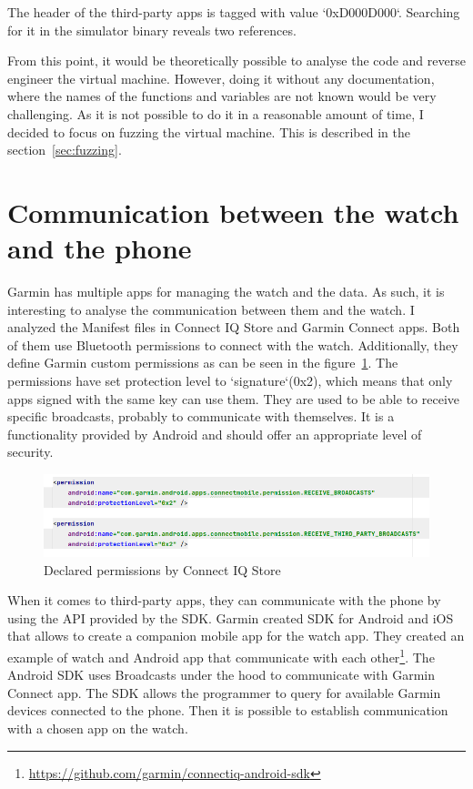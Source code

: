 The header of the third-party apps is tagged with value `0xD000D000`\cite{broken-vm}.
Searching for it in the simulator binary reveals two references.

From this point, it would be theoretically possible to analyse the code and reverse engineer the virtual machine.
However, doing it without any documentation, where the names of the functions and variables are not known would be very challenging.
As it is not possible to do it in a reasonable amount of time, I decided to focus on fuzzing the virtual machine.
This is described in the section~\ref{sec:fuzzing}.

\section{Communication between the watch and the phone} \label{subsec:communication-watch-phone}

Garmin has multiple apps for managing the watch and the data.
As such, it is interesting to analyse the communication between them and the watch.
I analyzed the Manifest files in Connect IQ Store and Garmin Connect apps.
Both of them use Bluetooth permissions to connect with the watch.
Additionally, they define Garmin custom permissions as can be seen in the figure~\ref{fig:connect-iq-declared-permissions}.
The permissions have set protection level to `signature`(0x2), which means that only apps signed with the same key can use them.
They are used to be able to receive specific broadcasts, probably to communicate with themselves.
It is a functionality provided by Android and should offer an appropriate level of security.

\begin{figure}[h]
    \centering
    \includegraphics[width=1\linewidth]{../../images/android-declared-permissions}
    \caption{Declared permissions by Connect IQ Store}
    \label{fig:connect-iq-declared-permissions}
\end{figure}

When it comes to third-party apps, they can communicate with the phone by using the API provided by the SDK\@.
Garmin created SDK for Android and iOS that allows to create a companion mobile app for the watch app.
They created an example of watch and Android app that communicate with each other\footnote{\url{https://github.com/garmin/connectiq-android-sdk}}.
The Android SDK uses Broadcasts under the hood to communicate with Garmin Connect app.
The SDK allows the programmer to query for available Garmin devices connected to the phone.
Then it is possible to establish communication with a chosen app on the watch.

